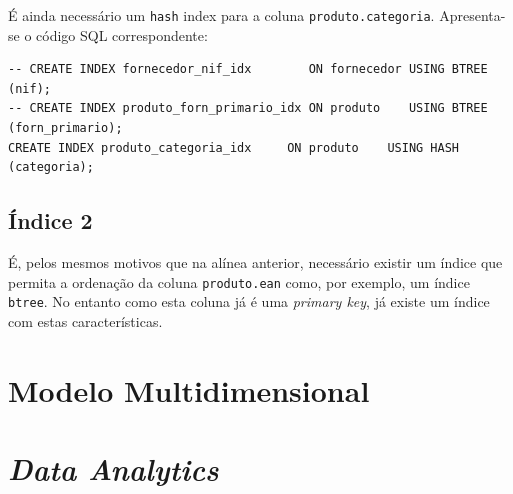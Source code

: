 \documentclass[a4paper]{article}
\begin{document}
    É ainda necessário um \lstinline{hash} index para a coluna \lstinline{produto.categoria}.
    Apresenta-se o código SQL correspondente:

    \begin{lstlisting}
-- CREATE INDEX fornecedor_nif_idx        ON fornecedor USING BTREE (nif);
-- CREATE INDEX produto_forn_primario_idx ON produto    USING BTREE (forn_primario);
CREATE INDEX produto_categoria_idx     ON produto    USING HASH  (categoria);
    \end{lstlisting}

    \subsection{Índice 2}
    É, pelos mesmos motivos que na alínea anterior, necessário existir um índice que permita a ordenação da coluna \lstinline{produto.ean}
    como, por exemplo, um índice \lstinline{btree}.
    No entanto como esta coluna já é uma \textit{primary key}, já existe um índice com estas
    características.

    \section{Modelo Multidimensional}

    \section{\textit{Data Analytics}}
\end{document}
